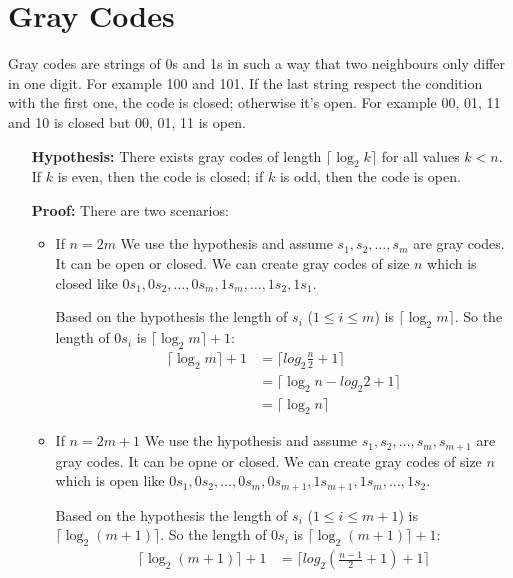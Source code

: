 \documentclass{book}
\begin{document}
	\section{Gray Codes}
	Gray codes are strings of 0s and 1s in such a way that two neighbours only differ in one digit. For example 100 and 101. If the last string respect the condition with the first one, the code is closed; otherwise it's open. For example 00, 01, 11 and 10 is closed but 00, 01, 11 is open. 
	\begin{itemize}
		\item[\textbf{Hypothesis:}] There exists gray codes of length $\lceil \log_2{k} \rceil$ for all values $k < n$. If $k$ is even, then the code is closed; if $k$ is odd, then the code is open.
		\item[\textbf{Proof:}] There are two scenarios:
		\begin{itemize}
			\item If $n = 2m$ We use the hypothesis and assume $s_1, s_2, \dots, s_m$ are gray codes. It can be open or closed. We can create gray codes of size $n$ which is closed like $0s_1, 0s_2, \dots, 0s_m, 1s_m, \dots, 1s_2, 1s_1$.
			\par Based on the hypothesis the length of $s_i$ ($1 \le i \le m$) is $\lceil \log_2{m} \rceil$. So the length of $0s_i$ is $\lceil \log_2{m} \rceil + 1$:
			\begin{equation*}
				\begin{split}
					\lceil \log_2{m} \rceil + 1 &= \lceil log_2{\frac{n}{2}} +1 \rceil \\
					&= \lceil \log_2{n} - log_2{2} + 1 \rceil \\
					&= \lceil \log_2{n} \rceil
				\end{split}
			\end{equation*}
			\item If $n = 2m + 1$  We use the hypothesis and assume $s_1, s_2, \dots, s_m, s_{m + 1}$ are gray codes. It can be opne or closed. We can create gray codes of size $n$ which is open like $0s_1, 0s_2, \dots, 0s_m, 0s_{m + 1}, 1s_{m + 1}, 1s_m, \dots, 1s_2$.
			\par Based on the hypothesis the length of $s_i$ ($1 \le i \le m + 1$) is $\lceil \log_2{(m + 1)} \rceil$. So the length of $0s_i$ is $\lceil \log_2{(m + 1)} \rceil + 1$:
			\begin{equation*}
				\begin{split}
					\lceil \log_2{(m + 1)} \rceil + 1 &= \lceil log_2{(\frac{n - 1}{2} + 1)} +1 \rceil \\

\end{split}
\end{equation*}
\end{itemize}
\end{itemize}
\end{document}

